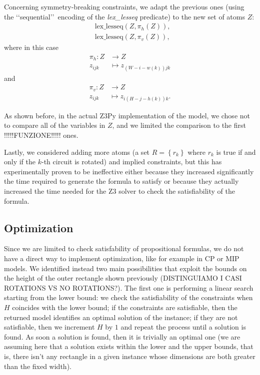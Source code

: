 \documentclass[]{article}
\begin{document}
Concerning symmetry-breaking constraints, we adapt the previous ones (using the \lq\lq sequential\rq \rq\, encoding of the \emph{lex\_lesseq} predicate) to the new set of atoms $Z$:
\begin{align*}
	& \text{lex\_lesseq}(Z,\pi_h(Z)), \\
	& \text{lex\_lesseq}(Z,\pi_v(Z)),
\end{align*}
where in this case 
\begin{align*}
	\pi_h \colon Z & \longrightarrow Z \\
	z_{ijk} & \longmapsto z_{(W-i-w(k))jk}
\end{align*}
and \begin{align*}
	\pi_v \colon Z & \longrightarrow Z \\
	z_{ijk} & \longmapsto z_{i(H-j-h(k))k}.
\end{align*}

As shown before, in the actual Z3Py implementation of the model, we chose not to compare all of the variables in $Z$, and we limited the comparison to the first !!!!!FUNZIONE!!!!! ones.

Lastly, we considered adding more atoms (a set $R=\left\{r_k\right\}$ where $r_k$ is true if and only if the $k$-th circuit is rotated) and implied constraints, but this has experimentally proven to be ineffective either because they increased significantly the time required to generate the formula to satisfy or because they actually increased the time needed for the Z3 solver to check the satisfiability of the formula.

\subsection{Optimization}
Since we are limited to check satisfability of propositional formulas, we do not have a direct way to implement optimization, like for example in CP or MIP models. We identified instead two main possibilities that exploit the bounds on the height of the outer rectangle shown previously (DISTINGUIAMO I CASI ROTATIONS VS NO ROTATIONS?). The first one is performing a linear search starting from the lower bound: we check the satisfiability of the constraints when $H$ coincides with the lower bound; if the constraints are satisfiable, then the returned model identifies an optimal solution of the instance; if they are not satisfiable, then we increment $H$ by $1$ and repeat the process until a solution is found. As soon a solution is found, then it is trivially an optimal one (we are assuming here that a solution exists within the lower and the upper bounds, that is, there isn't any rectangle in a given instance whose dimensions are both greater than the fixed width).
\end{document}
